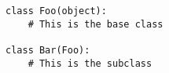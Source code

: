 \vspace{110mm}

\begin{lstlisting}
class Foo(object):
    # This is the base class

class Bar(Foo):
    # This is the subclass
\end{lstlisting}